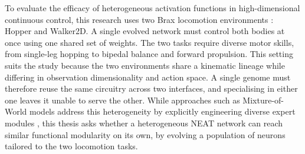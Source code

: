\documentclass[12pt]{article}
\newcommand{\revAcro}[2]{#2}
\begin{document}
To evaluate the efficacy of heterogeneous activation functions in high-dimensional continuous control, this research uses two Brax locomotion environments \parencite{freeman_brax_2021}: Hopper and Walker2D.
A single evolved network must control both bodies at once using one shared set of weights.
The two tasks require diverse motor skills, from single-leg hopping to bipedal balance and forward propulsion.
This setting suits the study because the two environments share a kinematic lineage while differing in observation dimensionality and action space. A single genome must therefore reuse the same circuitry across two interfaces, and specialising in either one leaves it unable to serve the other.
While approaches such as \revAcro{A-08}{Mixture-of-World models} address this heterogeneity by explicitly engineering diverse expert modules \parencite{zhang_mixtureofworld_2026}, this thesis asks whether a heterogeneous NEAT network can reach similar functional modularity on its own, by evolving a population of neurons tailored to the two locomotion tasks.



\end{document}
